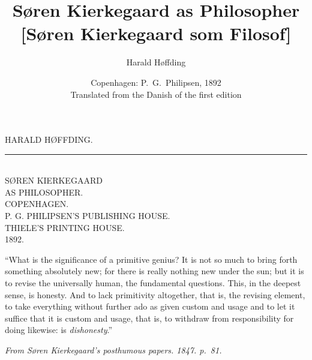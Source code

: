 \documentclass[12pt,a4paper]{book}
\title{\textbf{\Large Søren Kierkegaard as Philosopher}\\[8pt]
  \large [Søren Kierkegaard som Filosof]}
\author{Harald Høffding}
\date{Copenhagen: P.\ G.\ Philipsen, 1892\\[10pt]
  \small Translated from the Danish of the first edition}
\begin{document}
\maketitle
\thispagestyle{empty}
\clearpage

\begin{center}
HARALD HØFFDING.\\[12pt]
\rule{2cm}{0.4pt}\\[18pt]
{\Large SØREN KIERKEGAARD}\\[8pt]
AS PHILOSOPHER.\\[24pt]
COPENHAGEN.\\
P. G. PHILIPSEN'S PUBLISHING HOUSE.\\[4pt]
{\small THIELE'S PRINTING HOUSE.}\\[4pt]
1892.
\end{center}
\clearpage

``What is the significance of a primitive genius? It is not so
much to bring forth something absolutely new; for there is really
nothing new under the sun; but it is to revise the universally human,
the fundamental questions. This, in the deepest sense, is honesty.
And to lack primitivity altogether, that is, the revising element,
to take everything without further ado as given custom and usage and
to let it suffice that it is custom and usage, that is, to withdraw from
responsibility for doing likewise: is \textit{dishonesty}.''

\begin{flushright}\small\textit{From Søren Kierkegaard's posthumous papers. 1847. p.~81.}\end{flushright}
\clearpage
\end{document}

